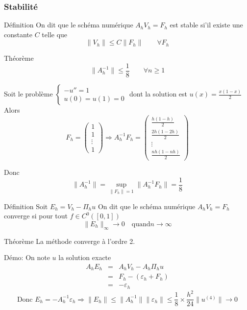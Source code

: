 \documentclass{beamer}
\begin{document}
 \begin{frame}
  \frametitle{Stabilité}
  \begin{block}{Définition}
  On dit que le schéma numérique $A_h V_h =F_h$  est stable si'il existe une constante $C$ telle que
  \[\|V_h\|\leq C\|F_h\|  \qquad \forall F_h\]
  \end{block}
  \begin{block}{Théorème}
   \[\|A_h^{-1}\|\leq \frac{1}{8}  \qquad \forall n\geq 1\]
  \end{block}
   Soit le problème 
   $\left\{\begin{array}{l}
   -u''=1\\
   u(0)=u(1)=0
   \end{array}\right.$ dont la solution est $u(x)=\frac{x(1-x)}{2}$
   Alors 
   \[F_h=\left(\begin{array}{c}1\\1\\ \vdots \\1 \end{array}\right)\Longrightarrow A_h^{-1}F_h = 
   \left(\begin{array}{c}\frac{h(1-h)}{2}\\\frac{2h(1-2h)}{2}\\ \vdots\\ \frac{nh(1-nh)}{2} \end{array}\right)
   \]
  \end{frame} 
 
 \begin{frame} 
   
   
 Donc \[ \|A_h^{-1}\|=\sup_{\|F_h\|=1}\|A_h^{-1}F_h\|=\frac 18\]
 \begin{block}{Définition}
  Soit $E_h=V_h-\Pi_h u$  On dit que le schéma numérique $A_h V_h =F_h$  converge  si pour tout $f\in C^0([0,1])$ 
  \[\|E_h\|_{\infty}\to 0 \quad \mbox{quand} n\to \infty\]
  \end{block}
 \begin{block}{Théorème}
  La méthode converge à l'ordre 2.
  \end{block}
  Démo: On note $u$ la solution exacte
  \[
  \begin{array}{ccl}
  A_hE_h&=& A_hV_h-A_h\Pi_h u\\
  &=& F_h-(\varepsilon_h+F_h)\\
  &=&-\varepsilon_h
  \end{array}
  \]
  \[\mbox{Donc } E_h=-A_h^{-1}\varepsilon_h\Longrightarrow \|E_h\|\leq \|A_h^{-1}\| \|\varepsilon_h\|\leq \frac{1}{8}\times \frac{h^2}{24} \|u^{(4)}\|\to 0 \]
 \end{frame} 
 
\end{document}
